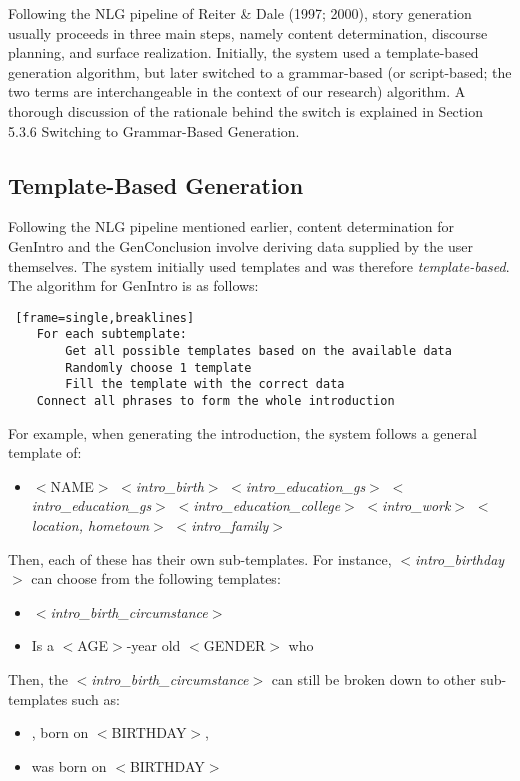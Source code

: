 Following the NLG pipeline of Reiter \& Dale (1997; 2000), story generation usually proceeds in three main steps, namely content determination, discourse planning, and surface realization. Initially, the system used a template-based generation algorithm, but later switched to a grammar-based (or script-based; the two terms are interchangeable in the context of our research) algorithm. A thorough discussion of the rationale behind the switch is explained in Section 5.3.6 Switching to Grammar-Based Generation.

\subsection{Template-Based Generation}
Following the NLG pipeline mentioned earlier, content determination for GenIntro and the GenConclusion involve deriving data supplied by the user themselves. The system initially used templates and was therefore \textit{template-based}. The algorithm for GenIntro is as follows:
\begin{lstlisting} [frame=single,breaklines]
	For each subtemplate:
		Get all possible templates based on the available data
		Randomly choose 1 template
		Fill the template with the correct data
	Connect all phrases to form the whole introduction
\end{lstlisting}

For example, when generating the introduction, the system follows a general template of:
\begin{itemize}
	\item $<$NAME$>$ $<$\textit{intro\_birth}$>$  $<$\textit{intro\_education\_gs}$>$ $<$\textit{intro\_education\_gs}$>$ $<$\textit{intro\_education\_college}$>$ $<$\textit{intro\_work}$>$ $<$\textit{location, hometown}$>$ $<$\textit{intro\_family}$>$
\end{itemize}

Then, each of these has their own sub-templates. For instance, $<$\textit{intro\_birthday}$>$ can choose from the following templates:
\begin{itemize}
	\item $<$\textit{intro\_birth\_circumstance}$>$
	\item Is a $<$AGE$>$-year old $<$GENDER$>$ who
\end{itemize}

Then, the $<$\textit{intro\_birth\_circumstance}$>$ can still be broken down to other sub-templates such as:
\begin{itemize}
	\item , born on $<$BIRTHDAY$>$,
	\item was born on $<$BIRTHDAY$>$
\end{itemize}

